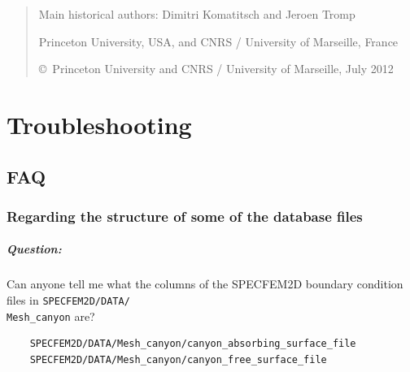 \documentclass[oneside,english,onecolumn,letterpaper]{book}
\begin{document}
\begin{quote}
Main historical authors: Dimitri Komatitsch and Jeroen Tromp

Princeton University, USA,
and CNRS / University of Marseille, France

\copyright\ Princeton University and CNRS / University of Marseille, July 2012
\end{quote}






\appendix



\chapter{\label{cha:Troubleshooting}Troubleshooting}



\section*{FAQ}

\subsection*{Regarding the structure of some of the database files}

\paragraph{Question:} Can anyone tell me what the columns of the SPECFEM2D boundary
condition files in \texttt{SPECFEM2D/DATA/}~\\
\texttt{Mesh\_canyon} are?
%
\begin{verbatim}
    SPECFEM2D/DATA/Mesh_canyon/canyon_absorbing_surface_file
    SPECFEM2D/DATA/Mesh_canyon/canyon_free_surface_file
\end{verbatim}
\end{document}
